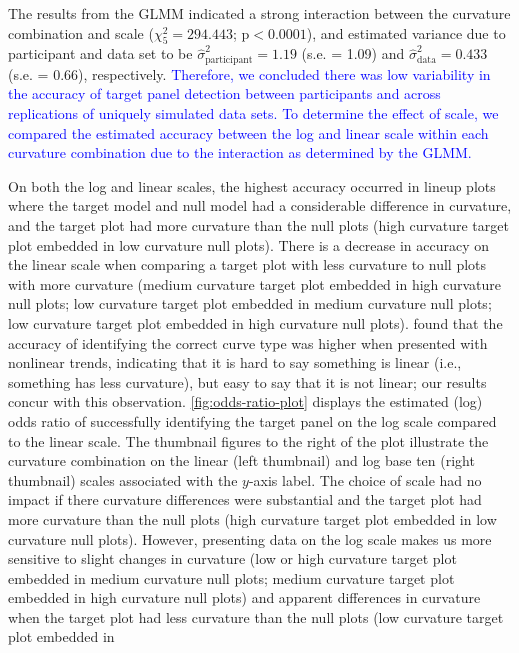 \documentclass[12pt]{article}
\begin{document}
The results from the GLMM indicated a strong interaction between the
curvature combination and scale (\(\chi^2_5 = 294.443\);
\(\text{p} <0.0001\)), and estimated variance due to participant and
data set to be \(\hat\sigma^2_{\text{participant}} = 1.19\) (s.e. =
1.09) and \(\hat\sigma^2_{\text{data}} = 0.433\) (s.e. = 0.66),
respectively.
{\textcolor{blue}{Therefore, we concluded there was low variability in the accuracy of target panel detection between participants and across replications of uniquely simulated data sets.
To determine the effect of scale, we compared the estimated accuracy between the log and linear scale within each curvature combination due to the interaction as determined by the GLMM.}}

On both the log and linear scales, the highest accuracy occurred in
lineup plots where the target model and null model had a considerable
difference in curvature, and the target plot had more curvature than the
null plots (high curvature target plot embedded in low curvature null
plots). There is a decrease in accuracy on the linear scale when
comparing a target plot with less curvature to null plots with more
curvature (medium curvature target plot embedded in high curvature null
plots; low curvature target plot embedded in medium curvature null
plots; low curvature target plot embedded in high curvature null plots).
\citet{best_perception_2007} found that the accuracy of identifying the
correct curve type was higher when presented with nonlinear trends,
indicating that it is hard to say something is linear (i.e., something
has less curvature), but easy to say that it is not linear; our results
concur with this observation. \cref{fig:odds-ratio-plot} displays the
estimated (log) odds ratio of successfully identifying the target panel
on the log scale compared to the linear scale. The thumbnail figures to
the right of the plot illustrate the curvature combination on the linear
(left thumbnail) and log base ten (right thumbnail) scales associated
with the \(y\)-axis label. The choice of scale had no impact if there
curvature differences were substantial and the target plot had more
curvature than the null plots (high curvature target plot embedded in
low curvature null plots). However, presenting data on the log scale
makes us more sensitive to slight changes in curvature (low or high
curvature target plot embedded in medium curvature null plots; medium
curvature target plot embedded in high curvature null plots) and
apparent differences in curvature when the target plot had less
curvature than the null plots (low curvature target plot embedded in
\end{document}
